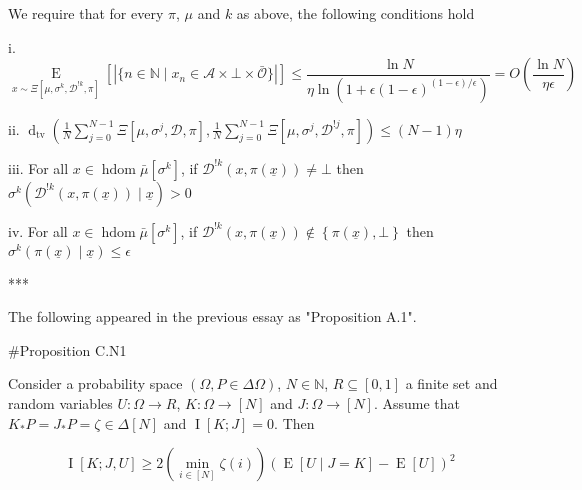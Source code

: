 \documentclass[a4paper]{article}
\newcommand{\AC}[1]{\left\{#1\right\}}
\newcommand{\E}[1]{\underset{#1}{\operatorname{E}}}
\newcommand{\I}[1]{\underset{#1}{\operatorname{I}}}
\newcommand{\Dtv}{\operatorname{d}_{\text{tv}}}
\newcommand{\Nats}{\mathbb{N}}
\newcommand{\Abs}[1]{\left\vert #1 \right\vert}
\newcommand{\Ob}{\mathcal{O}}
\newcommand{\A}{\mathcal{A}}
\DeclareMathOperator{\HD}{hdom}
\newcommand{\Dl}{\mathcal{D}}
\newcommand{\J}{J}
\begin{document}
We require that for every $\pi$, $\mu$ and $k$ as above, the following conditions hold

i. $$\E{x \sim\Xi\left[\mu,\sigma^k,\Dl^{!k},\pi\right]}\left[\Abs{\{n \in \Nats \mid x_n \in \A \times \bot \times \bar{\Ob}\}}\right] \leq \frac{\ln N}{\eta \ln\left(1 + \epsilon(1-\epsilon)^{(1-\epsilon)/\epsilon}\right)}=O\left(\frac{\ln N}{\eta \epsilon}\right)$$

ii. $\Dtv\left(\frac{1}{N}\sum_{j=0}^{N-1}{\Xi\left[\mu,\sigma^j,\Dl,\pi\right]},\frac{1}{N}\sum_{j=0}^{N-1}{\Xi\left[\mu,\sigma^j,\Dl^{!j},\pi\right]}\right) \leq (N-1)\eta$

iii. For all $x \in \HD{\bar{\mu}[\sigma^k]}$, if $\Dl^{!k}\left(x,\pi\left(\underline{x}\right)\right) \ne \bot$ then $\sigma^k\left(\Dl^{!k}\left(x,\pi\left(\underline{x}\right)\right) \mid \underline{x}\right) > 0$

iv. For all $x \in \HD{\bar{\mu}[\sigma^k]}$, if $\Dl^{!k}\left(x,\pi\left(\underline{x}\right)\right) \not\in \AC{\pi\left(\underline{x}\right), \bot}$ then $\sigma^k\left(\pi\left(\underline{x}\right) \mid \underline{x}\right) \leq \epsilon$

***

The following appeared in the previous essay as "Proposition A.1".

\#Proposition C.N1

Consider a probability space $(\Omega, P \in \Delta\Omega)$, $N \in \Nats$, $R \subseteq [0,1]$ a finite set and random variables $U: \Omega \rightarrow R$, $K: \Omega \rightarrow [N]$ and $\J: \Omega \rightarrow [N]$. Assume that $K_*P = J_*P = \zeta \in \Delta[N]$ and $\I{}[K;J] = 0$. Then

$$\I{}\left[K;J,U\right] \geq 2 \left(\min_{i \in [N]} {\zeta(i)}\right) \left(\E{}\left[U \mid J = K\right]-\E{}\left[U\right]\right)^2$$
\end{document}
